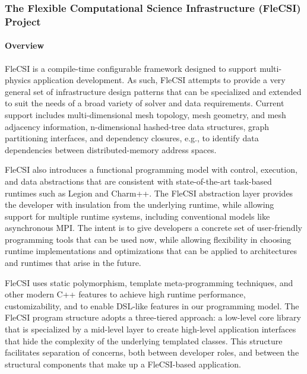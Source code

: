 \subsubsection{The Flexible Computational Science Infrastructure (FleCSI) Project} 

\paragraph{Overview} 

FleCSI\cite{FleCSI} is a compile-time configurable framework designed to
support multi-physics application development. As such, FleCSI attempts
to provide a very general set of infrastructure design patterns that can
be specialized and extended to suit the needs of a broad variety of
solver and data requirements. Current support includes multi-dimensional
mesh topology, mesh geometry, and mesh adjacency information,
n-dimensional hashed-tree data structures, graph partitioning
interfaces, and dependency closures, e.g., to identify data dependencies
between distributed-memory address spaces.

FleCSI also introduces a functional programming model with control,
execution, and data abstractions that are consistent with state-of-the-art
task-based runtimes such as Legion\cite{Bauer:2012:LEL:2388996.2389086}
and Charm++\cite{Kale:1993:CPC:165854.165874,
Kale:1993:CPC:167962.165874}.  The FleCSI abstraction layer provides the
developer with insulation from the underlying runtime, while allowing
support for multiple runtime systems, including conventional models like
asynchronous MPI\cite{TheMPIForum:1993:MMP:169627.169855}.  The intent
is to give developers a concrete set of user-friendly programming tools
that can be used now, while allowing flexibility in choosing runtime
implementations and optimizations that can be applied to architectures
and runtimes that arise in the future.

FleCSI uses static polymorphism, template meta-programming techniques,
and other modern C++ features to achieve high runtime performance,
customizability, and to enable DSL-like features in our programming
model. The FleCSI program structure adopts a three-tiered approach: a
low-level core library that is specialized by a mid-level layer to
create high-level application interfaces that hide the complexity of the
underlying templated classes. This structure facilitates separation of
concerns, both between developer roles, and between the structural
components that make up a FleCSI-based application.

